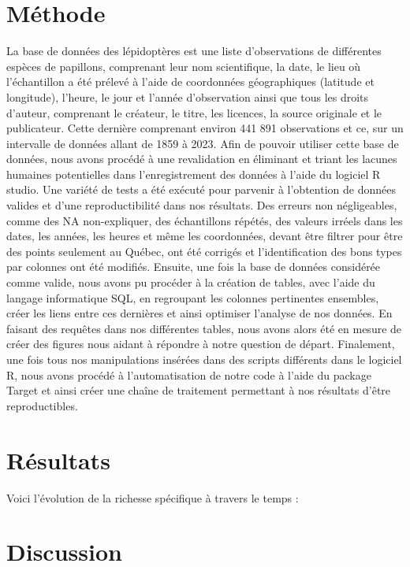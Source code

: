 \documentclass[9pt,twocolumn,twoside,]{pnas-new}
\begin{document}
\section*{Méthode}\label{muxe9thode}

La base de données des lépidoptères est une liste d'observations de
différentes espèces de papillons, comprenant leur nom scientifique, la
date, le lieu où l'échantillon a été prélevé à l'aide de coordonnées
géographiques (latitude et longitude), l'heure, le jour et l'année
d'observation ainsi que tous les droits d'auteur, comprenant le
créateur, le titre, les licences, la source originale et le publicateur.
Cette dernière comprenant environ 441 891 observations et ce, sur un
intervalle de données allant de 1859 à 2023. Afin de pouvoir utiliser
cette base de données, nous avons procédé à une revalidation en
éliminant et triant les lacunes humaines potentielles dans
l'enregistrement des données à l'aide du logiciel R studio. Une variété
de tests a été exécuté pour parvenir à l'obtention de données valides et
d'une reproductibilité dans nos résultats. Des erreurs non négligeables,
comme des NA non-expliquer, des échantillons répétés, des valeurs
irréels dans les dates, les années, les heures et même les coordonnées,
devant être filtrer pour être des points seulement au Québec, ont été
corrigés et l'identification des bons types par colonnes ont été
modifiés. Ensuite, une fois la base de données considérée comme valide,
nous avons pu procéder à la création de tables, avec l'aide du langage
informatique SQL, en regroupant les colonnes pertinentes ensembles,
créer les liens entre ces dernières et ainsi optimiser l'analyse de nos
données. En faisant des requêtes dans nos différentes tables, nous avons
alors été en mesure de créer des figures nous aidant à répondre à notre
question de départ. Finalement, une fois tous nos manipulations insérées
dans des scripts différents dans le logiciel R, nous avons procédé à
l'automatisation de notre code à l'aide du package Target et ainsi créer
une chaîne de traitement permettant à nos résultats d'être
reproductibles.

\section*{Résultats}\label{ruxe9sultats}

Voici l'évolution de la richesse spécifique à travers le temps :

\section*{Discussion}\label{discussion}
\end{document}
